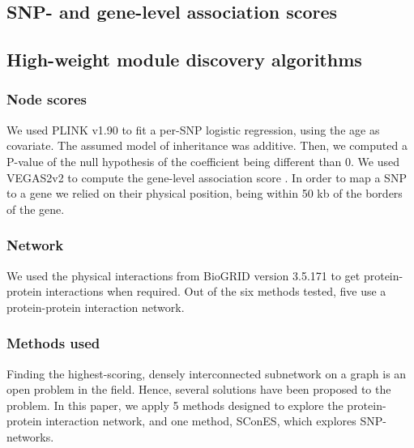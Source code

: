 \documentclass{article}
\begin{document}
\subsection{SNP- and gene-level association scores}


\subsection{High-weight module discovery algorithms}

\subsubsection{Node scores}

We used PLINK v1.90 \cite{chang_second-generation_2015} to fit a per-SNP
logistic regression, using the age as covariate. The assumed model of
inheritance was additive. Then, we computed a P-value of the null hypothesis of
the coefficient being different than 0. We used VEGAS2v2 to compute the
gene-level association score \cite{mishra_vegas2:_2015}. In order to map a SNP
to a gene we relied on their physical position, being within 50 kb of the
borders of the gene.

\subsubsection{Network}

We used the physical interactions from BioGRID version 3.5.171
\cite{oughtred_biogrid_2019} to get protein-protein interactions when required.
Out of the six methods tested, five use a protein-protein interaction network.

\subsubsection{Methods used}

Finding the highest-scoring, densely interconnected subnetwork on a graph is an
open problem in the field. Hence, several solutions have been proposed to the
problem. In this paper, we apply 5 methods designed to explore the
protein-protein interaction network, and one method, SConES, which explores
SNP-networks.

 \cite{dittrich_identifying_2008}

 \cite{reyna_hierarchical_2018}


 \cite{gwinner_network-based_2016}
\end{document}
